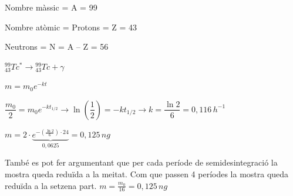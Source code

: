 \begin{solapartat}
 Nombre màssic = A = 99

\smallskip
{} Nombre atòmic = Protons = Z = 43

\smallskip
{} Neutrons = N = A -- Z = 56

\smallskip
{} ${}^{99}_{43}Tc^{*} \rightarrow {}^{99}_{43}Tc + \gamma$
\end{solapartat}

\begin{solapartat}
 $m = m_0 e^{-kt}$

\smallskip
{} $\dfrac{m_0}{2} = m_0 e^{-kt_{1/2}} \rightarrow \ln\!\left(\dfrac{1}{2}\right) = -kt_{1/2} \rightarrow k = \dfrac{\ln 2}{6} = 0,116\,h^{-1}$

\smallskip
{} $m = 2\cdot\underbrace{e^{-\left(\frac{\ln 2}{6}\right)\cdot 24}}_{0,0625} = 0,125\,ng$

\medskip
També es pot fer argumentant que per cada període de semidesintegració la mostra queda reduïda a la meitat. Com que passen 4 períodes la mostra queda reduïda a la setzena part. $m = \frac{m_0}{16} = 0,125\,ng$
\end{solapartat}

